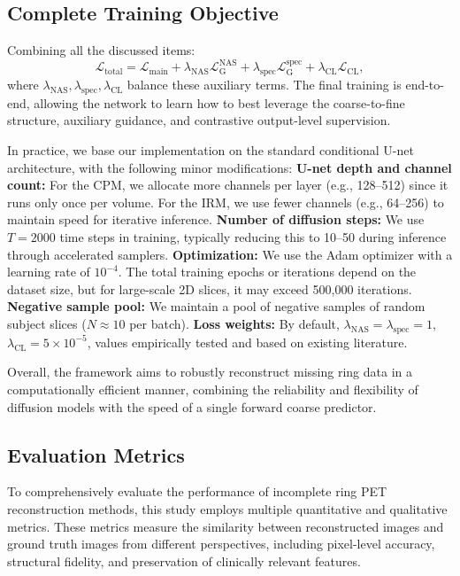 \documentclass[
reprint,
superscriptaddress,
nofootinbib,
amsmath,amssymb,
aps,
prd,
]{revtex4-2}
\begin{document}
\subsection{Complete Training Objective}
Combining all the discussed items:
\begin{equation}
\label{eq:total_loss}
\mathcal{L}_{\text{total}} = 
\mathcal{L}_{\text{main}} + \lambda_{\text{NAS}}\mathcal{L}_{\text{G}}^{\text{NAS}} + \lambda_{\text{spec}}\mathcal{L}_{\text{G}}^{\text{spec}} + \lambda_{\text{CL}}\mathcal{L}_{\text{CL}},
\end{equation}
where \(\lambda_{\text{NAS}}, \lambda_{\text{spec}}, \lambda_{\text{CL}}\) balance these auxiliary terms. The final training is end-to-end, allowing the network to learn how to best leverage the coarse-to-fine structure, auxiliary guidance, and contrastive output-level supervision.

In practice, we base our implementation on the standard conditional U-net architecture\cite{Saharia2022}, with the following minor modifications:
\textbf{U-net depth and channel count:} For the CPM, we allocate more channels per layer (e.g., 128--512) since it runs only once per volume. For the IRM, we use fewer channels (e.g., 64--256) to maintain speed for iterative inference.
\textbf{Number of diffusion steps:} We use \(T=2000\) time steps in training, typically reducing this to 10--50 during inference through accelerated samplers.
\textbf{Optimization:} We use the Adam optimizer with a learning rate of \(10^{-4}\). The total training epochs or iterations depend on the dataset size, but for large-scale 2D slices, it may exceed 500,000 iterations.
\textbf{Negative sample pool:} We maintain a pool of negative samples of random subject slices (\(N\approx10\) per batch).
\textbf{Loss weights:} By default, \(\lambda_{\text{NAS}}=\lambda_{\text{spec}}=1\), \(\lambda_{\text{CL}}=5\times10^{-5}\), values empirically tested and based on existing literature\cite{Zhu2022}.

Overall, the framework aims to robustly reconstruct missing ring data in a computationally efficient manner, combining the reliability and flexibility of diffusion models with the speed of a single forward coarse predictor.


\subsection{Evaluation Metrics}

To comprehensively evaluate the performance of incomplete ring PET reconstruction methods, this study employs multiple quantitative and qualitative metrics. These metrics measure the similarity between reconstructed images and ground truth images from different perspectives, including pixel-level accuracy, structural fidelity, and preservation of clinically relevant features.
\end{document}

